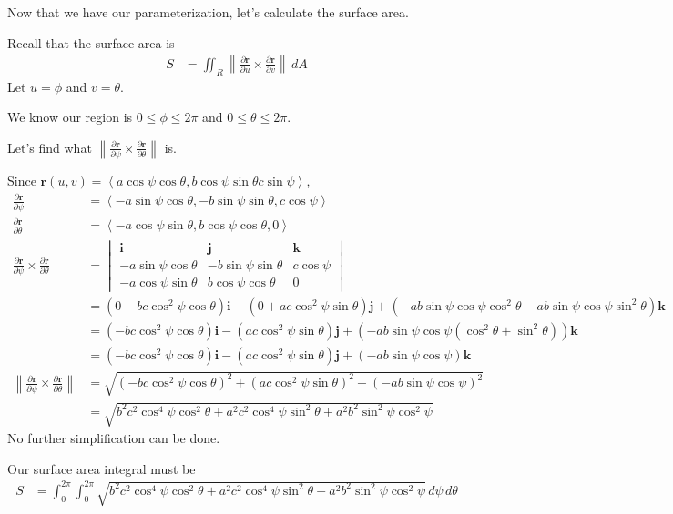 \documentclass{article}
\newcommand{\lrp}[1]{\left( #1 \right)}
\newcommand{\lra}[1]{\left\langle #1 \right\rangle}
\newcommand{\norm}[1]{\left\lVert #1 \right\rVert}
\renewcommand{\i}[0]{\mathbf{i}}
\renewcommand{\j}[0]{\mathbf{j}}
\renewcommand{\k}[0]{\mathbf{k}}
\renewcommand{\r}[0]{\mathbf{r}}
\begin{document}
Now that we have our parameterization, let's calculate the surface area.

Recall that the surface area is
\begin{align*}
    S&=\iint_R \norm{\frac{\partial \r}{\partial u}\times \frac{\partial \r}{\partial v}}\,dA
\end{align*}
Let $u=\phi$ and $v=\theta$.

We know our region is $0\leq \phi\leq 2\pi$ and $0\leq \theta\leq 2\pi$.

Let's find what $\displaystyle\norm{\frac{\partial \r}{\partial \psi}\times \frac{\partial \r}{\partial \theta}} $ is.

Since $\displaystyle \r(u,v)=\lra{a\cos \psi\cos \theta, b\cos \psi\sin \theta c\sin \psi}$,
\begin{align*}
    \frac{\partial \r}{\partial \psi}&=\lra{-a\sin \psi\cos \theta, -b\sin \psi\sin\theta, c\cos \psi}\\
    \frac{\partial \r}{\partial \theta}&=\lra{-a\cos\psi\sin\theta, b\cos\psi\cos\theta, 0}\\
    \frac{\partial \r}{\partial \psi}\times \frac{\partial \r}{\partial \theta}&=\begin{vmatrix}
    \i & \j & \k\\
    -a\sin \psi\cos \theta &-b\sin \psi\sin\theta &c\cos \psi\\
    -a\cos\psi\sin\theta&b\cos\psi\cos\theta&0
    \end{vmatrix}\\
    &=\lrp{0-bc\cos^2\psi\cos\theta}\i -\lrp{0+ac\cos^2\psi\sin\theta}\j+\lrp{-ab\sin\psi\cos\psi\cos^2\theta-ab\sin\psi\cos\psi\sin^2\theta}\k\\
    &=\lrp{-bc\cos^2\psi\cos\theta}\i-\lrp{ac\cos^2\psi\sin\theta}\j+\lrp{-ab\sin\psi\cos\psi\lrp{\cos^2\theta+\sin^2\theta}}\k\\
    &=\lrp{-bc\cos^2\psi\cos\theta}\i-\lrp{ac\cos^2\psi\sin\theta}\j+\lrp{-ab\sin\psi\cos\psi}\k\tag{$\cos^2\theta+\sin^2\theta=1$}\\
    \norm{\frac{\partial \r}{\partial \psi}\times \frac{\partial \r}{\partial \theta}}&=\sqrt{\lrp{-bc\cos^2\psi\cos\theta}^2+\lrp{ac\cos^2\psi\sin\theta}^2+\lrp{-ab\sin\psi\cos\psi}^2}\\
    &=\sqrt{b^2c^2\cos^4\psi\cos^2\theta+a^2c^2\cos^4\psi\sin^2\theta+a^2b^2\sin^2\psi\cos^2\psi}
\end{align*}
No further simplification can be done.

Our surface area integral must be
\begin{align*}
    S&=\int_0^{2\pi}\int_0^{2\pi}\sqrt{b^2c^2\cos^4\psi\cos^2\theta+a^2c^2\cos^4\psi\sin^2\theta+a^2b^2\sin^2\psi\cos^2\psi}\,d\psi\,d\theta
\end{align*}
\end{document}
